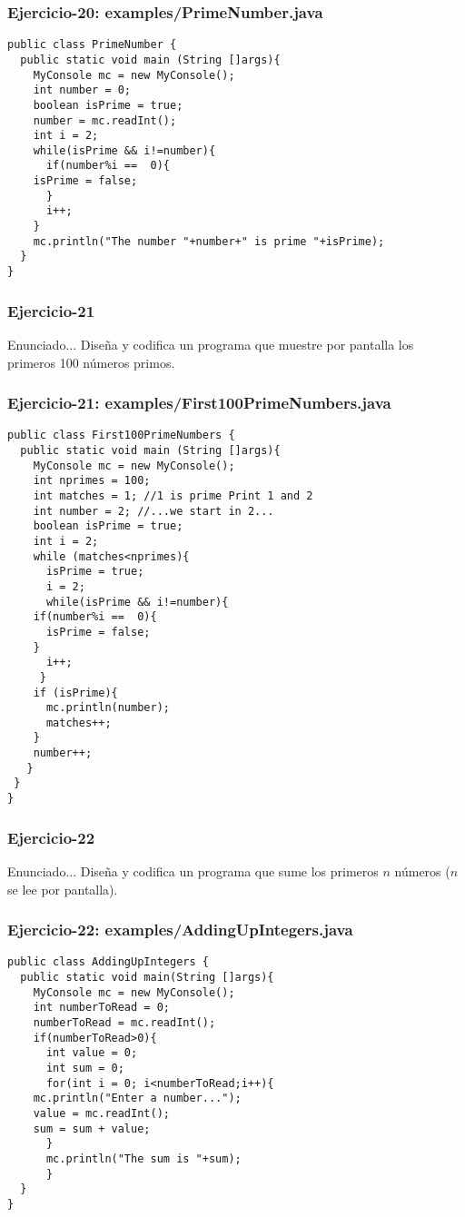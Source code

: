 \documentclass[xcolor=dvipsnames,dvip,notes=show,handout,table]{beamer}
\begin{document}
\begin{frame}[fragile]
\frametitle{Ejercicio-20: examples/PrimeNumber.java}
\scriptsize
\begin{lstlisting}
public class PrimeNumber {
  public static void main (String []args){
    MyConsole mc = new MyConsole();
    int number = 0;
    boolean isPrime = true;
    number = mc.readInt();
    int i = 2;
    while(isPrime && i!=number){
      if(number%i ==  0){
	isPrime = false;
      }
      i++;
    }
    mc.println("The number "+number+" is prime "+isPrime);
  }
}
\end{lstlisting}
\end{frame}




\begin{frame}[fragile]
\frametitle{Ejercicio-21}
\begin{block}{Enunciado...}
Diseña y codifica un programa que muestre por pantalla los primeros 100 números primos.
\end{block}

\end{frame}


\begin{frame}[fragile]
\frametitle{Ejercicio-21: examples/First100PrimeNumbers.java}
\tiny
\begin{lstlisting}
public class First100PrimeNumbers {
  public static void main (String []args){
    MyConsole mc = new MyConsole();
    int nprimes = 100;
    int matches = 1; //1 is prime Print 1 and 2
    int number = 2; //...we start in 2...
    boolean isPrime = true;			
    int i = 2;
    while (matches<nprimes){
      isPrime = true;
      i = 2;
      while(isPrime && i!=number){
	if(number%i ==  0){
	  isPrime = false;
	}
      i++;
     }
    if (isPrime){
      mc.println(number);
      matches++;
    }
    number++;
   }
 }
}
\end{lstlisting}
\end{frame}




\begin{frame}[fragile]
\frametitle{Ejercicio-22}
\begin{block}{Enunciado...}
Diseña y codifica un programa que sume los primeros $n$ números ($n$ se lee por pantalla).
\end{block}

\end{frame}


\begin{frame}[fragile]
\frametitle{Ejercicio-22: examples/AddingUpIntegers.java}
\scriptsize
\begin{lstlisting}
public class AddingUpIntegers {
  public static void main(String []args){
    MyConsole mc = new MyConsole();
    int numberToRead = 0;
    numberToRead = mc.readInt();
    if(numberToRead>0){
      int value = 0;
      int sum = 0;
      for(int i = 0; i<numberToRead;i++){
	mc.println("Enter a number...");
	value = mc.readInt();
	sum = sum + value;
      }
      mc.println("The sum is "+sum);
      }
  }
}
\end{lstlisting}
\end{frame}
\end{document}
